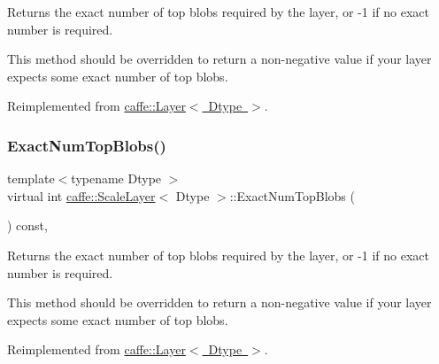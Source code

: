 Returns the exact number of top blobs required by the layer, or -\/1 if no exact number is required. 

This method should be overridden to return a non-\/negative value if your layer expects some exact number of top blobs. 

Reimplemented from \mbox{\hyperlink{classcaffe_1_1_layer_a64e2ca72c719e4b2f1f9216ccfb0d37f}{caffe\+::\+Layer$<$ Dtype $>$}}.

\mbox{\label{classcaffe_1_1_scale_layer_aeffb8fcfc522f7365c23b0e6ae5c232e}} 
\subsubsection{\texorpdfstring{Exact\+Num\+Top\+Blobs()}{ExactNumTopBlobs()}\hspace{0.1cm}{\footnotesize\ttfamily [2/2]}}
{\footnotesize\ttfamily template$<$typename Dtype $>$ \\
virtual int \mbox{\hyperlink{classcaffe_1_1_scale_layer}{caffe\+::\+Scale\+Layer}}$<$ Dtype $>$\+::Exact\+Num\+Top\+Blobs (\begin{DoxyParamCaption}{ }\end{DoxyParamCaption}) const\hspace{0.3cm}{\ttfamily [inline]}, {\ttfamily [virtual]}}



Returns the exact number of top blobs required by the layer, or -\/1 if no exact number is required. 

This method should be overridden to return a non-\/negative value if your layer expects some exact number of top blobs. 

Reimplemented from \mbox{\hyperlink{classcaffe_1_1_layer_a64e2ca72c719e4b2f1f9216ccfb0d37f}{caffe\+::\+Layer$<$ Dtype $>$}}.

\mbox{\label{classcaffe_1_1_scale_layer_ade35e0412d540efa96ec7b45c9a7134d}} 
